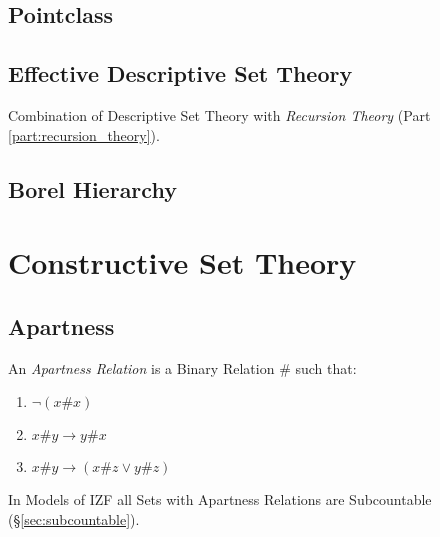 \subsection{Pointclass}\label{sec:pointclass}

\subsection{Effective Descriptive Set Theory}
\label{sec:effective_descriptive}

Combination of Descriptive Set Theory with \emph{Recursion Theory}
(Part \ref{part:recursion_theory}).

\subsection{Borel Hierarchy}\label{sec:borel_hierarchy}



\section{Constructive Set Theory}\label{sec:constructive_set_theory}

\subsection{Apartness}\label{sec:apartness}

An \emph{Apartness Relation} is a Binary Relation $\#$ such that:

\begin{enumerate}
\item $\neg (x\#x)$
\item $x\#y \rightarrow y\#x$
\item $x\#y \rightarrow (x\#z \vee y\#z)$
\end{enumerate}

In Models of IZF all Sets with Apartness Relations are Subcountable
(\S\ref{sec:subcountable}).



